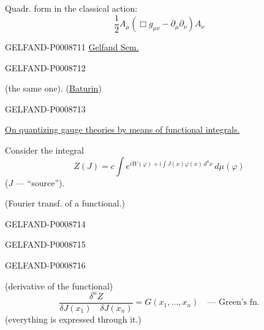 Quadr. form in the classical action:
\begin{equation*}
\frac12 A_\mu(\Box g_{\mu\nu}-\partial_\mu\partial_\nu)A_\nu
\tag{28}
\end{equation*}


\begin{GelfandAdjacentEvidence}{GELFAND-P000871}{1}
\qquad\uline{Gelfand Sem.}
\end{GelfandAdjacentEvidence}
\begin{GelfandAdjacentEvidence}{GELFAND-P000871}{2}


 (the same one). (\uline{Baturin})
\end{GelfandAdjacentEvidence}
\begin{GelfandAdjacentEvidence}{GELFAND-P000871}{3}


\uline{On quantizing gauge theories by means of functional integrals.}

Consider the integral
\begin{equation*}
Z(J)=c\int e^{iW(\varphi)+i\int J(x)\varphi(x)\,d^4x}\,d\mu(\varphi)
\tag{1}
\end{equation*}
($J$ --- “source”).

(Fourier transf. of a functional.)
\end{GelfandAdjacentEvidence}
\begin{GelfandAdjacentEvidence}{GELFAND-P000871}{4}

\end{GelfandAdjacentEvidence}
\begin{GelfandAdjacentEvidence}{GELFAND-P000871}{5}

\end{GelfandAdjacentEvidence}
\begin{GelfandAdjacentEvidence}{GELFAND-P000871}{6}


(derivative of the functional)
\begin{equation*}
\frac{\delta^n Z}{\delta J(x_1)\quad\delta J(x_n)}
=G(x_1,\ldots,x_n)\quad\text{--- Green's fn.}
\tag{2}
\end{equation*}
(everything is expressed through it.)
\end{GelfandAdjacentEvidence}
